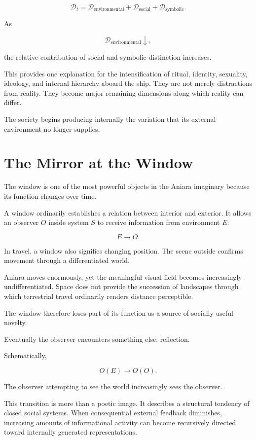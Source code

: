 \documentclass[11pt,oneside]{book}
\theoremstyle{definition}
\theoremstyle{remark}
\newcommand{\D}{\mathcal{D}}
\begin{document}
\[
\D_t
=
\D_{\mathrm{environmental}}
+
\D_{\mathrm{social}}
+
\D_{\mathrm{symbolic}}.
\]

As

\[
\D_{\mathrm{environmental}}\downarrow,
\]

the relative contribution of social and symbolic distinction increases.

This provides one explanation for the intensification of ritual, identity, sexuality, ideology, and internal hierarchy aboard the ship. They are not merely distractions from reality. They become major remaining dimensions along which reality can differ.

The society begins producing internally the variation that its external environment no longer supplies.

\section{The Mirror at the Window}

The window is one of the most powerful objects in the Aniara imaginary because its function changes over time.

A window ordinarily establishes a relation between interior and exterior. It allows an observer \(O\) inside system \(S\) to receive information from environment \(E\):

\[
E\rightarrow O.
\]

In travel, a window also signifies changing position. The scene outside confirms movement through a differentiated world.

Aniara moves enormously, yet the meaningful visual field becomes increasingly undifferentiated. Space does not provide the succession of landscapes through which terrestrial travel ordinarily renders distance perceptible.

The window therefore loses part of its function as a source of socially useful novelty.

Eventually the observer encounters something else: reflection.

Schematically,

\[
O(E)
\rightarrow
O(O).
\]

The observer attempting to see the world increasingly sees the observer.

This transition is more than a poetic image. It describes a structural tendency of closed social systems. When consequential external feedback diminishes, increasing amounts of informational activity can become recursively directed toward internally generated representations.
\end{document}
